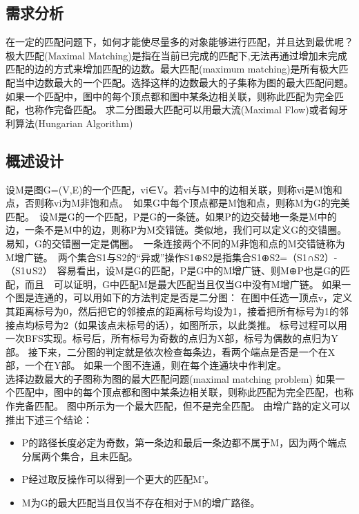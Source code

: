 \documentclass[UTF8,a4paper]{article}
\begin{document}
\subsection{需求分析}
在一定的匹配问题下，如何才能使尽量多的对象能够进行匹配，并且达到最优呢？
极大匹配(Maximal Matching)是指在当前已完成的匹配下,无法再通过增加未完成匹配的边的方式来增加匹配的边数。最大匹配(maximum matching)是所有极大匹配当中边数最大的一个匹配。选择这样的边数最大的子集称为图的最大匹配问题。
如果一个匹配中，图中的每个顶点都和图中某条边相关联，则称此匹配为完全匹配，也称作完备匹配。
求二分图最大匹配可以用最大流(Maximal Flow)或者匈牙利算法(Hungarian Algorithm)
\subsection{概述设计}
设M是图G=(V,E)的一个匹配，vi∈V。若vi与M中的边相关联，则称vi是M饱和点，否则称vi为M非饱和点。　如果G中每个顶点都是M饱和点，则称M为G的完美匹配。　设M是G的一个匹配，P是G的一条链。如果P的边交替地一条是M中的边，一条不是M中的边，则称P为M交错链。类似地，我们可以定义G的交错圈。易知，G的交错圈一定是偶圈。　一条连接两个不同的M非饱和点的M交错链称为M增广链。　两个集合S1与S2的“异或”操作S1⊕S2是指集合S1⊕S2=（S1∩S2）-（S1∪S2）　容易看出，设M是G的匹配，P是G中的M增广链、则M⊕P也是G的匹配，而且　可以证明，G中匹配M是最大匹配当且仅当G中没有M增广链。
如果一个图是连通的，可以用如下的方法判定是否是二分图：
在图中任选一顶点v，定义其距离标号为0，然后把它的邻接点的距离标号均设为1，接着把所有标号为1的邻接点均标号为2（如果该点未标号的话），如图所示，以此类推。
标号过程可以用一次BFS实现。标号后，所有标号为奇数的点归为X部，标号为偶数的点归为Y部。
接下来，二分图的判定就是依次检查每条边，看两个端点是否是一个在X部，一个在Y部。
如果一个图不连通，则在每个连通块中作判定。\\

选择边数最大的子图称为图的最大匹配问题(maximal matching problem)
如果一个匹配中，图中的每个顶点都和图中某条边相关联，则称此匹配为完全匹配，也称作完备匹配。
图中所示为一个最大匹配，但不是完全匹配。
由增广路的定义可以推出下述三个结论：
\begin{itemize}
    \item P的路径长度必定为奇数，第一条边和最后一条边都不属于M，因为两个端点分属两个集合，且未匹配。
    \item P经过取反操作可以得到一个更大的匹配M’。
    \item M为G的最大匹配当且仅当不存在相对于M的增广路径。
\end{itemize}
\end{document}
